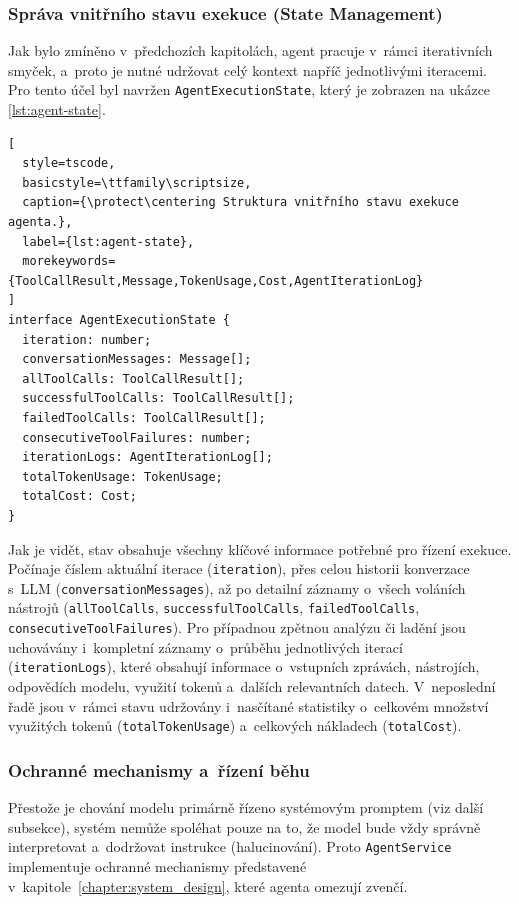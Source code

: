 \documentclass[czech, ing, kiv, he, iso690numb, viewonly]{fasthesis}
\begin{document}
\subsubsection*{Správa vnitřního stavu exekuce (State Management)}
Jak bylo zmíněno v~předchozích kapitolách, agent pracuje v~rámci iterativních smyček, 
a~proto je nutné udržovat celý kontext napříč jednotlivými iteracemi.
Pro tento účel byl navržen \texttt{AgentExecutionState}, který je zobrazen na ukázce \ref{lst:agent-state}. 

\begin{lstlisting}[
  style=tscode,
  basicstyle=\ttfamily\scriptsize,
  caption={\protect\centering Struktura vnitřního stavu exekuce agenta.},
  label={lst:agent-state},
  morekeywords={ToolCallResult,Message,TokenUsage,Cost,AgentIterationLog}
]
interface AgentExecutionState {
  iteration: number;
  conversationMessages: Message[];
  allToolCalls: ToolCallResult[];
  successfulToolCalls: ToolCallResult[];
  failedToolCalls: ToolCallResult[];
  consecutiveToolFailures: number;
  iterationLogs: AgentIterationLog[];
  totalTokenUsage: TokenUsage;
  totalCost: Cost;
}
\end{lstlisting}

Jak je vidět, stav obsahuje všechny klíčové informace potřebné pro řízení exekuce.
Počínaje číslem aktuální iterace (\texttt{iteration}), přes celou historii konverzace s~LLM (\texttt{conversationMessages}), 
až po detailní záznamy o~všech voláních nástrojů (\texttt{allToolCalls}, \texttt{successfulToolCalls}, \texttt{failedToolCalls}, \texttt{consecutiveToolFailures}).
Pro případnou zpětnou analýzu či ladění jsou uchovávány i~kompletní záznamy o~průběhu jednotlivých iterací (\texttt{iterationLogs}), 
které obsahují informace o~vstupních zprávách, nástrojích, odpovědích modelu, využití tokenů a~dalších relevantních datech.
V~neposlední řadě jsou v~rámci stavu udržovány i~nasčítané statistiky o~celkovém množství využitých tokenů (\texttt{totalTokenUsage}) 
a~celkových nákladech (\texttt{totalCost}).

\subsubsection*{Ochranné mechanismy a~řízení běhu}

Přestože je chování modelu primárně řízeno systémovým promptem (viz další subsekce), 
systém nemůže spoléhat pouze na to, že model bude vždy správně interpretovat a~dodržovat instrukce (halucinování).
Proto \texttt{AgentService} implementuje ochranné mechanismy představené v~kapitole~\ref{chapter:system_design}, které 
agenta omezují zvenčí.
\end{document}
